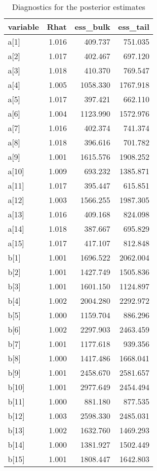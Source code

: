 \begin{table}[!h]

\caption{\label{tab:diagnostics-a-b-aggregated}Diagnostics for the posterior estimates}
\centering
\begin{tabular}[t]{lrrr}
\toprule
variable & Rhat & ess\_bulk & ess\_tail\\
\midrule
a[1] & 1.016 & 409.737 & 751.035\\
a[2] & 1.017 & 402.467 & 697.120\\
a[3] & 1.018 & 410.370 & 769.547\\
a[4] & 1.005 & 1058.330 & 1767.918\\
a[5] & 1.017 & 397.421 & 662.110\\
a[6] & 1.004 & 1123.990 & 1572.976\\
a[7] & 1.016 & 402.374 & 741.374\\
a[8] & 1.018 & 396.616 & 701.782\\
a[9] & 1.001 & 1615.576 & 1908.252\\
a[10] & 1.009 & 693.232 & 1385.871\\
a[11] & 1.017 & 395.447 & 615.851\\
a[12] & 1.003 & 1566.255 & 1987.305\\
a[13] & 1.016 & 409.168 & 824.098\\
a[14] & 1.018 & 387.667 & 695.829\\
a[15] & 1.017 & 417.107 & 812.848\\
b[1] & 1.001 & 1696.522 & 2062.004\\
b[2] & 1.001 & 1427.749 & 1505.836\\
b[3] & 1.001 & 1601.150 & 1124.897\\
b[4] & 1.002 & 2004.280 & 2292.972\\
b[5] & 1.000 & 1159.704 & 886.296\\
b[6] & 1.002 & 2297.903 & 2463.459\\
b[7] & 1.001 & 1177.618 & 939.356\\
b[8] & 1.000 & 1417.486 & 1668.041\\
b[9] & 1.001 & 2458.670 & 2581.657\\
b[10] & 1.001 & 2977.649 & 2454.494\\
b[11] & 1.000 & 881.180 & 877.535\\
b[12] & 1.003 & 2598.330 & 2485.031\\
b[13] & 1.002 & 1632.760 & 1469.293\\
b[14] & 1.000 & 1381.927 & 1502.449\\
b[15] & 1.001 & 1808.447 & 1642.803\\
\bottomrule
\end{tabular}
\end{table}
